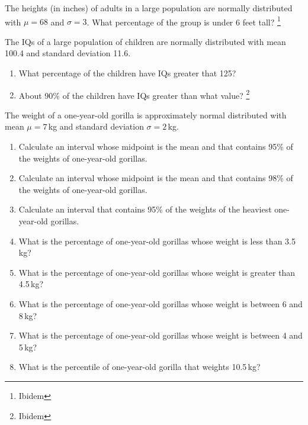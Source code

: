 \begin{problem}  %
  The heights (in inches) of adults in a large population are normally
  distributed with $\mu=68$ and $\sigma=3$. What percentage of the
  group is under 6 feet tall? \footnote{Ibidem}
\end{problem}

\begin{problem} %
  The IQs of a large population of children are normally distributed
  with mean 100.4 and standard deviation 11.6. 
  \begin{enumerate} \renewcommand{\theenumi}{\roman{enumi}}
  \item What percentage of the children have IQs greater that 125? 
  \item About 90\% of the children have IQs greater than what value? \footnote{Ibidem}
  \end{enumerate}
\end{problem}


\begin{problem}
  The weight of a one-year-old gorilla is approximately normal
  distributed with mean $\mu=7$\,kg and standard deviation
  $\sigma=2$\,kg. 
  \begin{enumerate} \renewcommand{\theenumi}{\roman{enumi}}
  \item Calculate an interval whose midpoint is the mean and that
    contains 95\% of the weights of one-year-old gorillas. 
 \item Calculate an interval  whose midpoint is the mean and that
    contains 98\% of the weights of one-year-old gorillas. 
 \item Calculate an interval  that
    contains 95\% of the weights of the heaviest one-year-old
    gorillas. 
 \item What is the percentage of one-year-old gorillas whose weight is less than
   3.5\,kg?
 \item What  is the percentage of one-year-old gorillas whose weight is greater than
   4.5\,kg?
  \item What  is the percentage of one-year-old gorillas whose weight is between 6
    and 8\,kg?
\item What  is the percentage of one-year-old gorillas whose weight is between 4 
    and 5\,kg?
\item What is the percentile of one-year-old gorilla that weights
  10.5\,kg? 
  \end{enumerate}
\end{problem}

